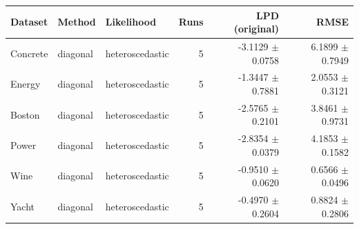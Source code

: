 \begin{tabular}{lllrrr}
\toprule
Dataset & Method & Likelihood & Runs & LPD (original) & RMSE \\
\midrule
Concrete & diagonal & heteroscedastic & 5 & -3.1129 $\pm$ 0.0758 & 6.1899 $\pm$ 0.7949 \\
Energy & diagonal & heteroscedastic & 5 & -1.3447 $\pm$ 0.7881 & 2.0553 $\pm$ 0.3121 \\
Boston & diagonal & heteroscedastic & 5 & -2.5765 $\pm$ 0.2101 & 3.8461 $\pm$ 0.9731 \\
Power & diagonal & heteroscedastic & 5 & -2.8354 $\pm$ 0.0379 & 4.1853 $\pm$ 0.1582 \\
Wine & diagonal & heteroscedastic & 5 & -0.9510 $\pm$ 0.0620 & 0.6566 $\pm$ 0.0496 \\
Yacht & diagonal & heteroscedastic & 5 & -0.4970 $\pm$ 0.2604 & 0.8824 $\pm$ 0.2806 \\
\bottomrule
\end{tabular}
